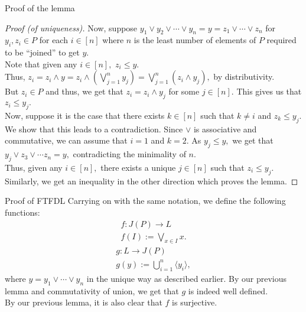 \documentclass[handout, aspectratio=169]{beamer}
\begin{document}
\begin{frame}{Proof of the lemma}
	\begin{proof}[Proof (of uniqueness)]
		Now, suppose $y_1 \vee y_2 \vee \cdots \vee y_n = y = z_1 \vee \cdots \vee z_n$ for $y_i, z_i \in P$ for each $i \in [n]$ where $n$ is the least number of elements of $P$ required to be ``joined'' to get $y.$\\
		Note that given any $i \in [n],$ $z_i \le y.$ \\
		Thus, $\displaystyle z_i = z_i \wedge y = z_i \wedge \left(\bigvee_{j=1}^n y_j\right) = \bigvee_{j=1}^n(z_i \wedge y_j),$ by distributivity.\\
		But $z_i \in P$ and thus, we get that $z_i = z_i \wedge y_j$ for some $j \in [n].$ This gives us that $z_i \le y_j.$\\
		Now, suppose it is the case that there exists $k \in [n]$ such that $k \neq i$ and $z_k \le y_j.$ We show that this leads to a contradiction. Since $\vee$ is associative and commutative, we can assume that $i = 1$ and $k = 2.$ As $y_j \le y,$ we get that $y_j \vee z_3 \vee \cdots z_n = y,$ contradicting the minimality of $n.$\\
		Thus, given any $i \in [n],$ there exists a unique $j\in [n]$ such that $z_i \le y_j.$ Similarly, we get an inequality in the other direction which proves the lemma.
	\end{proof}
\end{frame}
\begin{frame}{Proof of FTFDL}
	Carrying on with the same notation, we define the following functions:
	\begin{align*}
		f: J(P) \to L\\
		f(I) := \bigvee_{x \in I}x.
	\end{align*}
	\begin{align*}
		g: L \to J(P)\\
		g(y) := \bigcup_{i = 1}^n \langle y_i\rangle ,
	\end{align*}
	where $y = y_1 \vee \cdots \vee y_n$ in the unique way as described earlier. By our previous lemma and commutativity of union, we get that $g$ is indeed well defined.\\
	By our previous lemma, it is also clear that $f$ is surjective.\\
\end{frame}
\end{document}
